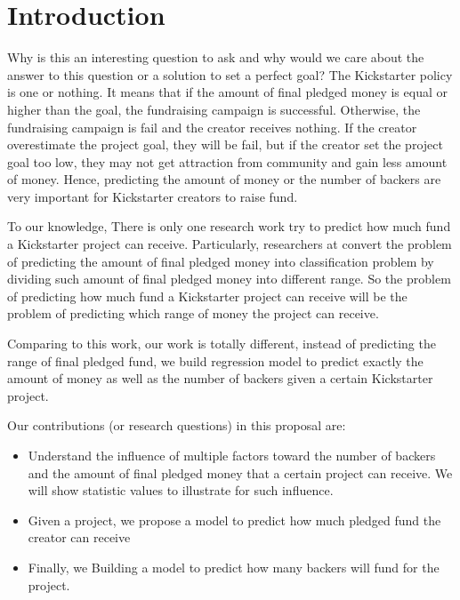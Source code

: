 \section{Introduction}
Why is this an interesting question to ask and why would we care about the answer to this question or a solution to set a perfect goal? The Kickstarter policy is one or nothing. It means that if the amount of final pledged money is equal or higher than the goal, the fundraising campaign is successful. Otherwise, the fundraising campaign is fail and the creator receives nothing. If the creator overestimate the project goal, they will be fail, but if the creator set the project goal too low, they may not get attraction from community and gain less amount of money. Hence, predicting the amount of money or the number of backers are very important for Kickstarter creators to raise fund.

To our knowledge, There is only one research work try to predict how much fund a Kickstarter project can receive. Particularly, researchers at \cite{chung2015long} convert the problem of predicting the amount of final pledged money into classification problem by dividing such amount of final pledged money into different range. So the problem of predicting how much fund a Kickstarter project can receive will be the problem of predicting which range of money the project can receive.

Comparing to this work, our work is totally different, instead of predicting the range of final pledged fund, we build regression model to predict exactly the amount of money as well as the number of backers given a certain Kickstarter project.

Our contributions (or research questions) in this proposal are:
\begin{itemize}
\item Understand the influence of multiple factors toward the number of backers and the amount of final pledged money that a certain project can receive. We will show statistic values to illustrate for such influence.
\item Given a project, we propose a model to predict how much pledged fund the creator can receive
\item Finally, we Building a model to predict how many backers will fund for the project.
\end{itemize}